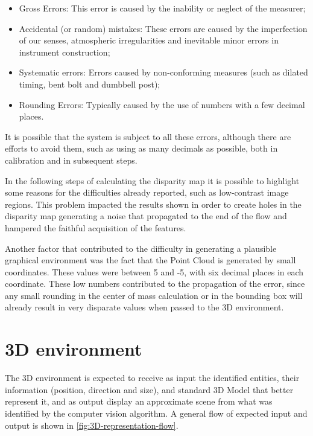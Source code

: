     \begin{itemize}
    \item Gross Errors: This error is caused by the inability or neglect of the measurer;
    \item Accidental (or random) mistakes: These errors are caused by the imperfection of our senses, atmospheric irregularities and inevitable minor errors in instrument construction;
    \item Systematic errors: Errors caused by non-conforming measures (such as dilated timing, bent bolt and dumbbell post);
    \item Rounding Errors: Typically caused by the use of numbers with a few decimal places.

\end{itemize}

    It is possible that the system is subject to all these errors, although there are efforts to avoid them, such as using as many decimals as possible, both in calibration and in subsequent steps.
    
    In the following steps of calculating the disparity map it is possible to highlight some reasons for the difficulties already reported, such as low-contrast image regions. This problem impacted the results shown in order to create holes in the disparity map generating a noise that propagated to the end of the flow and hampered the faithful acquisition of the features.
    
    Another factor that contributed to the difficulty in generating a plausible graphical environment was the fact that the Point Cloud is generated by small coordinates. These values were between 5 and -5, with six decimal places in each coordinate. These low numbers contributed to the propagation of the error, since any small rounding in the center of mass calculation or in the bounding box will already result in very disparate values when passed to the 3D environment.

\section{3D environment}
    
    The 3D environment is expected to receive as input the identified entities, their information (position, direction and size), and standard 3D Model  that better represent it, and as output display an approximate scene from what was identified by the computer vision algorithm. A general flow of expected input and output is shown in \autoref{fig:3D-representation-flow}.
    
